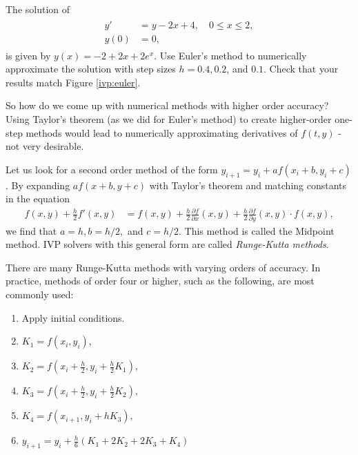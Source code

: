\begin{problem} The solution of
\begin{align}
	\begin{split}
		y' &= y - 2x + 4,\quad 0 \leq x \leq 2, \\
		y(0) &= 0,
	\end{split}\label{ivp:prob1}
\end{align}
is given by $y(x) = -2+2x + 2e^x.$
Use Euler's method to numerically approximate the solution with step sizes $h = 0.4, 0.2$, and $0.1.$ 
Check that your results match Figure \ref{ivp:euler}.
\end{problem}

So how do we come up with numerical methods with higher order accuracy? 
Using Taylor's theorem (as we did for Euler's method) to create higher-order one-step methods would lead to numerically approximating derivatives of $f(t,y)$ - not very desirable.

Let us look for a second order method of the form $y_{i+1} = y_i + a f(x_i+b, y_i+c)$. 
By expanding $a f(x+b, y+c)$ with Taylor's theorem and matching constants in the equation
\begin{align*}
f(x,y) + \frac{h}{2}f'(x,y) &= f(x,y) + \frac{h}{2}\frac{\partial f}{\partial x}(x,y) + \frac{h}{2}\frac{\partial f}{\partial y}(x,y) \cdot f(x,y),
\end{align*}
we find that $a = h, b = h/2,$ and $c = h/2$. 
This method is called the Midpoint method. 
IVP solvers with this general form are called \textit{Runge-Kutta methods}. 

There are many Runge-Kutta methods with varying orders of accuracy. 
In practice, methods of order four or higher, such as the following, are most commonly used:
\begin{enumerate}
\item Apply initial conditions.
\item $K_1 = f(x_i,y_i),$
\item $K_2 = f(x_i + \frac{h}{2}, y_i + \frac{h}{2} K_1),$
\item $K_3 = f(x_i + \frac{h}{2} , y_i + \frac{h}{2} K_2),$
\item $K_4 = f(x_{i+1} , y_i + h K_3),$
\item $y_{i+1} = y_i + \frac{h}{6}(K_1 + 2K_2 + 2K_3 + K_4)$
\end{enumerate}

